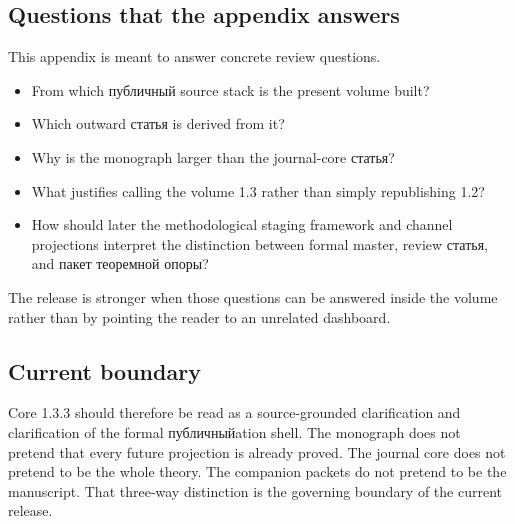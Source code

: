 \subsection{Questions that the appendix answers}

This appendix is meant to answer concrete review questions.

\begin{itemize}
\item From which публичный source stack is the present volume built?
\item Which outward статья is derived from it?
\item Why is the monograph larger than the journal-core статья?
\item What justifies calling the volume 1.3 rather than simply republishing 1.2?
\item How should later the methodological staging framework and channel projections interpret the distinction between formal
      master, review статья, and пакет теоремной опоры?
\end{itemize}

The release is stronger when those questions can be answered inside the volume rather than by
pointing the reader to an unrelated dashboard.

\subsection{Current boundary}

Core 1.3.3 should therefore be read as a source-grounded clarification and clarification of the formal
публичныйation shell.
The monograph does not pretend that every future projection is already proved.
The journal core does not pretend to be the whole theory.
The companion packets do not pretend to be the manuscript.
That three-way distinction is the governing boundary of the current release.

\clearpage
